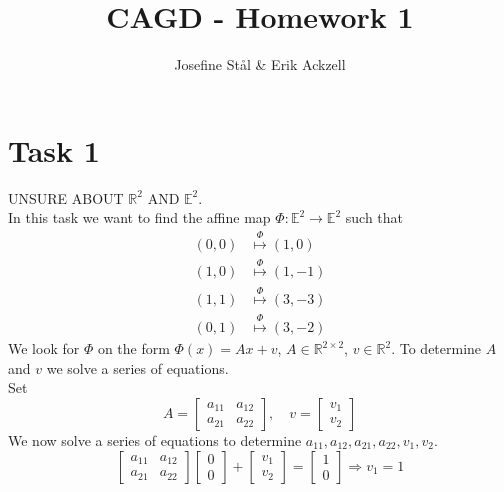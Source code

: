 \documentclass[]{article}
\title{CAGD - Homework 1}
\author{Josefine St{\aa}l \& Erik Ackzell}
\begin{document}
\maketitle
\section*{Task 1}
UNSURE ABOUT $\mathbb{R}^2$ AND $\mathbb{E}^2$.\\
In this task we want to find the affine map $\Phi:\mathbb{E}^2 \rightarrow \mathbb{E}^2$ such that \begin{equation*}
\begin{aligned}
(0,0)&\overset{\Phi}{\mapsto}(1,0)\\
(1,0)&\overset{\Phi}{\mapsto}(1,-1)\\
(1,1)&\overset{\Phi}{\mapsto}(3,-3)\\
(0,1)&\overset{\Phi}{\mapsto}(3,-2)
\end{aligned}
\end{equation*}
We look for $\Phi$ on the form $\Phi(x) = Ax + v$, $A\in \mathbb{R}^{2\times 2}$, $v\in \mathbb{R}^2$. To determine $A$ and $v$ we solve a series of equations.\\
Set \begin{equation*}
A=\left[\begin{array}{cc}
a_{11}&a_{12}\\
a_{21}&a_{22}
\end{array}\right], \quad v=\left[\begin{array}{c}
v_1\\
v_2
\end{array}\right]
\end{equation*}
We now solve a series of equations to determine $a_{11}, a_{12}, a_{21}, a_{22}, v_1, v_2$.
\begin{equation}
\left[\begin{array}{cc}
a_{11}&a_{12}\\
a_{21}&a_{22}
\end{array}\right]\left[\begin{array}{c}
0\\
0
\end{array}\right] + \left[\begin{array}{c}
v_1\\
v_2
\end{array}\right] = \left[\begin{array}{c}
1\\
0
\end{array}\right]\Rightarrow v_1=1\label{first}
\end{equation}
\end{document}
